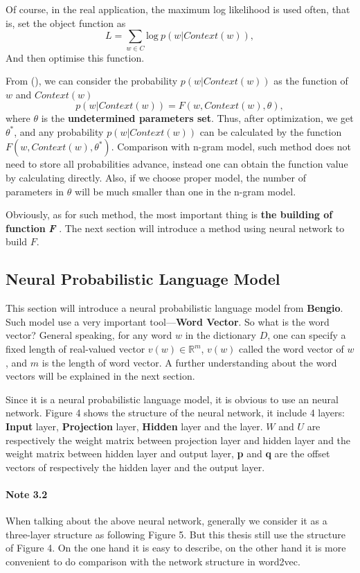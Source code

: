 Of course,  in the real application, the maximum log likelihood is used often, that is, set the object function as 
$$L=\sum_{w\in C} \mathrm{log}\ p(w|Context(w)),$$
And then optimise this function. 

From (), we can consider the probability $p(w|Context(w))$ as the function of $w$ and $Context(w)$
$$p(w|Context(w))=F(w,Context(w),\theta),$$
where $\theta$ is the \textbf{undetermined parameters set}. Thus, after optimization, we get $\theta^*$, and any probability $p(w|Context(w))$ can be calculated by the function $F(w,Context(w),\theta^*)$. Comparison with n-gram model, such method does not need to store all probabilities advance, instead one can obtain the function value by calculating directly. Also, if we choose proper model, the number of parameters in $\theta$ will be much smaller than one in the n-gram model.

Obviously, as for such method, the most important thing is \textbf{the building of function} \emph{\textbf{F}} . The next section will introduce a method using neural network to build $F$. 
\subsection{Neural Probabilistic Language Model}
This section will introduce a neural probabilistic language model from \textbf{Bengio}. Such model use a very important tool---\textbf{Word Vector}.
So what is the word vector? General speaking, for any word $w$ in the dictionary $D$, one can specify a fixed length of real-valued vector $v(w)\in \mathbb{R}^m$, $v(w)$ called the word vector of $w$, and $m$ is the length of word vector. A further understanding about the word vectors will be explained in the next section. 

Since it is a neural probabilistic language model, it is obvious to use an neural network. Figure 4 shows the structure of the neural network, it include 4 layers: \textbf{Input} layer, \textbf{Projection} layer, \textbf{Hidden} layer and the  layer. $W$ and $U$ are respectively the weight matrix between projection layer and hidden layer and the weight matrix between hidden layer and output layer, \textbf{p} and \textbf{q} are the offset vectors of respectively the hidden layer and the output layer.
 
\paragraph{Note 3.2} When talking about the above neural network, generally we consider it as a three-layer structure as following Figure 5. But this thesis still use the structure of Figure 4. On the one hand it is easy to describe, on the other hand it is more convenient to do comparison with the network structure in word2vec.

